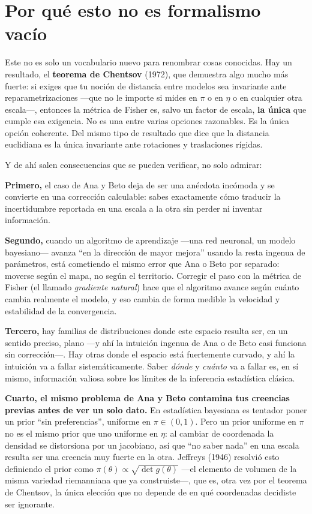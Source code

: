 \section*{Por qué esto no es formalismo vacío}

Este no es solo un vocabulario nuevo para renombrar cosas conocidas. Hay un resultado, el \textbf{teorema de Chentsov} (1972), que demuestra algo mucho más fuerte: si exiges que tu noción de distancia entre modelos sea invariante ante reparametrizaciones ---que no le importe si mides en $\pi$ o en $\eta$ o en cualquier otra escala---, entonces la métrica de Fisher es, salvo un factor de escala, \textbf{la única} que cumple esa exigencia. No es una entre varias opciones razonables. Es la única opción coherente. Del mismo tipo de resultado que dice que la distancia euclidiana es la única invariante ante rotaciones y traslaciones rígidas.

Y de ahí salen consecuencias que se pueden verificar, no solo admirar:

\textbf{Primero,} el caso de Ana y Beto deja de ser una anécdota incómoda y se convierte en una corrección calculable: sabes exactamente cómo traducir la incertidumbre reportada en una escala a la otra sin perder ni inventar información.

\textbf{Segundo,} cuando un algoritmo de aprendizaje ---una red neuronal, un modelo bayesiano--- avanza ``en la dirección de mayor mejora'' usando la resta ingenua de parámetros, está cometiendo el mismo error que Ana o Beto por separado: moverse según el mapa, no según el territorio. Corregir el paso con la métrica de Fisher (el llamado \emph{gradiente natural}) hace que el algoritmo avance según cuánto cambia realmente el modelo, y eso cambia de forma medible la velocidad y estabilidad de la convergencia.

\textbf{Tercero,} hay familias de distribuciones donde este espacio resulta ser, en un sentido preciso, plano ---y ahí la intuición ingenua de Ana o de Beto casi funciona sin corrección---. Hay otras donde el espacio está fuertemente curvado, y ahí la intuición va a fallar sistemáticamente. Saber \emph{dónde} y \emph{cuánto} va a fallar es, en sí mismo, información valiosa sobre los límites de la inferencia estadística clásica.

\textbf{Cuarto, el mismo problema de Ana y Beto contamina tus creencias previas antes de ver un solo dato.} En estadística bayesiana es tentador poner un prior ``sin preferencias'', uniforme en $\pi\in(0,1)$. Pero un prior uniforme en $\pi$ no es el mismo prior que uno uniforme en $\eta$: al cambiar de coordenada la densidad se distorsiona por un jacobiano, así que ``no saber nada'' en una escala resulta ser una creencia muy fuerte en la otra. Jeffreys (1946) resolvió esto definiendo el prior como $\pi(\theta)\propto\sqrt{\det g(\theta)}$ ---el elemento de volumen de la misma variedad riemanniana que ya construiste---, que es, otra vez por el teorema de Chentsov, la única elección que no depende de en qué coordenadas decidiste ser ignorante.

